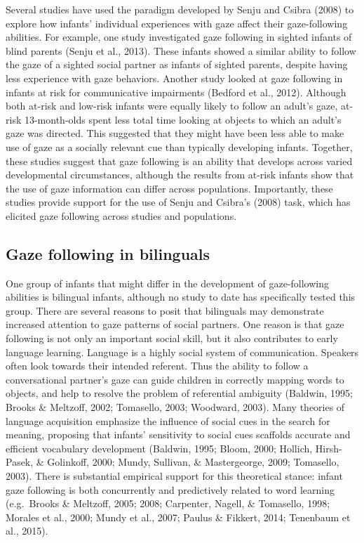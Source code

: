\documentclass[,man,floatsintext]{apa6}
\begin{document}
Several studies have used the paradigm developed by Senju and Csibra (2008) to explore how infants' individual experiences with gaze affect their gaze-following abilities. For example, one study investigated gaze following in sighted infants of blind parents (Senju et al., 2013). These infants showed a similar ability to follow the gaze of a sighted social partner as infants of sighted parents, despite having less experience with gaze behaviors. Another study looked at gaze following in infants at risk for communicative impairments (Bedford et al., 2012). Although both at-risk and low-risk infants were equally likely to follow an adult's gaze, at-risk 13-month-olds spent less total time looking at objects to which an adult's gaze was directed. This suggested that they might have been less able to make use of gaze as a socially relevant cue than typically developing infants. Together, these studies suggest that gaze following is an ability that develops across varied developmental circumstances, although the results from at-risk infants show that the use of gaze information can differ across populations. Importantly, these studies provide support for the use of Senju and Csibra's (2008) task, which has elicited gaze following across studies and populations.

\hypertarget{gaze-following-in-bilinguals}{%
\subsection{Gaze following in bilinguals}\label{gaze-following-in-bilinguals}}

One group of infants that might differ in the development of gaze-following abilities is bilingual infants, although no study to date has specifically tested this group. There are several reasons to posit that bilinguals may demonstrate increased attention to gaze patterns of social partners. One reason is that gaze following is not only an important social skill, but it also contributes to early language learning. Language is a highly social system of communication. Speakers often look towards their intended referent. Thus the ability to follow a conversational partner's gaze can guide children in correctly mapping words to objects, and help to resolve the problem of referential ambiguity (Baldwin, 1995; Brooks \& Meltzoff, 2002; Tomasello, 2003; Woodward, 2003). Many theories of language acquisition emphasize the influence of social cues in the search for meaning, proposing that infants' sensitivity to social cues scaffolds accurate and efficient vocabulary development (Baldwin, 1995; Bloom, 2000; Hollich, Hirsh-Pasek, \& Golinkoff, 2000; Mundy, Sullivan, \& Mastergeorge, 2009; Tomasello, 2003). There is substantial empirical support for this theoretical stance: infant gaze following is both concurrently and predictively related to word learning (e.g.~Brooks \& Meltzoff, 2005; 2008; Carpenter, Nagell, \& Tomasello, 1998; Morales et al., 2000; Mundy et al., 2007; Paulus \& Fikkert, 2014; Tenenbaum et al., 2015).
\end{document}
